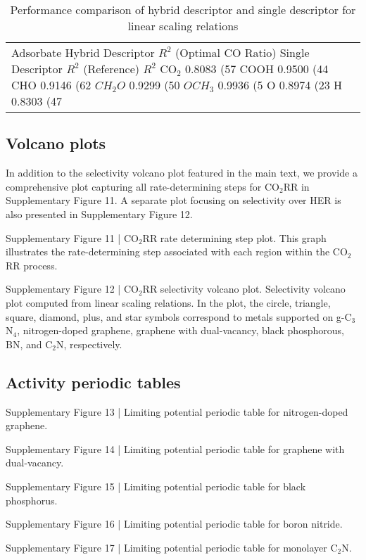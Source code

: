 \begin{table}[h]
    \centering
    \begin{tabular}{lr}
      \hline
      Adsorbate	Hybrid Descriptor $R^2$ (Optimal CO Ratio)	Single Descriptor $R^2$ (Reference)	\Delta$R^2$
      \hline
      CO$_2$	0.8083 (57 %
      COOH	0.9500 (44 %
      CHO	0.9146 (62 %
      $CH_2O$	0.9299 (50 %
      $OCH_3$	0.9936 (5 %
      O	0.8974 (23 %
      H	0.8303 (47 %
      \hline
    \end{tabular}
    \caption{Performance comparison of hybrid descriptor and single descriptor for linear scaling relations
    }
    \label{si_table14}
\end{table}


\subsection{Volcano plots}
In addition to the selectivity volcano plot featured in the main text, we provide a comprehensive plot capturing all rate-determining steps for CO$_2$RR in Supplementary Figure 11. A separate plot focusing on selectivity over HER is also presented in Supplementary Figure 12.


Supplementary Figure 11 | CO$_2$RR rate determining step plot. This graph illustrates the rate-determining step associated with each region within the CO$_2$RR process.


Supplementary Figure 12 | CO$_2$RR selectivity volcano plot. Selectivity volcano plot computed from linear scaling relations. In the plot, the circle, triangle, square, diamond, plus, and star symbols correspond to metals supported on g-C$_3$N$_4$, nitrogen-doped graphene, graphene with dual-vacancy, black phosphorous, BN, and C$_2$N, respectively.


\subsection{Activity periodic tables}


Supplementary Figure 13 | Limiting potential periodic table for nitrogen-doped graphene.


Supplementary Figure 14 | Limiting potential periodic table for graphene with dual-vacancy.


Supplementary Figure 15 | Limiting potential periodic table for black phosphorus.


Supplementary Figure 16 | Limiting potential periodic table for boron nitride.


Supplementary Figure 17 | Limiting potential periodic table for monolayer C$_2$N.
